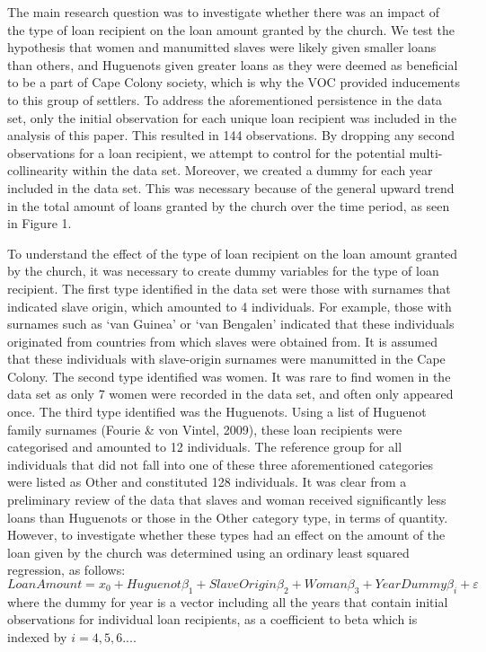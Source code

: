 \documentclass[11pt,preprint, authoryear]{elsarticle}
\numberwithin{equation}{section}
\numberwithin{figure}{section}
\numberwithin{table}{section}
\begin{document}
The main research question was to investigate whether there was an
impact of the type of loan recipient on the loan amount granted by the
church. We test the hypothesis that women and manumitted slaves were
likely given smaller loans than others, and Huguenots given greater
loans as they were deemed as beneficial to be a part of Cape Colony
society, which is why the VOC provided inducements to this group of
settlers. To address the aforementioned persistence in the data set,
only the initial observation for each unique loan recipient was included
in the analysis of this paper. This resulted in 144 observations. By
dropping any second observations for a loan recipient, we attempt to
control for the potential multi-collinearity within the data set.
Moreover, we created a dummy for each year included in the data set.
This was necessary because of the general upward trend in the total
amount of loans granted by the church over the time period, as seen in
Figure 1.

To understand the effect of the type of loan recipient on the loan
amount granted by the church, it was necessary to create dummy variables
for the type of loan recipient. The first type identified in the data
set were those with surnames that indicated slave origin, which amounted
to 4 individuals. For example, those with surnames such as `van Guinea'
or `van Bengalen' indicated that these individuals originated from
countries from which slaves were obtained from. It is assumed that these
individuals with slave-origin surnames were manumitted in the Cape
Colony. The second type identified was women. It was rare to find women
in the data set as only 7 women were recorded in the data set, and often
only appeared once. The third type identified was the Huguenots. Using a
list of Huguenot family surnames (Fourie \& von Vintel, 2009), these
loan recipients were categorised and amounted to 12 individuals. The
reference group for all individuals that did not fall into one of these
three aforementioned categories were listed as Other and constituted 128
individuals. It was clear from a preliminary review of the data that
slaves and woman received significantly less loans than Huguenots or
those in the Other category type, in terms of quantity. However, to
investigate whether these types had an effect on the amount of the loan
given by the church was determined using an ordinary least squared
regression, as follows: \[
LoanAmount = x_0 + Huguenot \beta_1 + SlaveOrigin \beta_2 + Woman \beta_3 + YearDummy \beta_i + \varepsilon
\] where the dummy for year is a vector including all the years that
contain initial observations for individual loan recipients, as a
coefficient to beta which is indexed by \(i=4, 5, 6...\).
\end{document}
